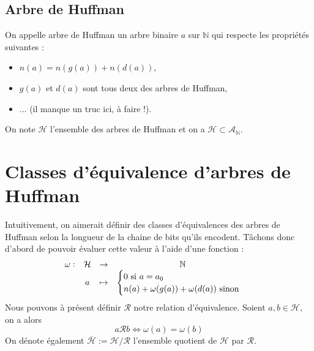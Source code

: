 \documentclass[a4paper, 12pt]{article}
\let\iff\Longleftrightarrow
\begin{document}
\subsection{Arbre de Huffman}
On appelle arbre de Huffman un arbre binaire $a$ sur $\mathbb{N}$ qui respecte les propriétés suivantes :
\begin{itemize}
\item $n(a) = n(g(a))+n(d(a))$,
\item $g(a)$ et $d(a)$ sont tous deux des arbres de Huffman,
\item ... (il manque un truc ici, à faire !).
\end{itemize}
On note $\mathcal{H}$ l'ensemble des arbres de Huffman et on a $\mathcal{H} \subset \mathcal{A}_\mathbb{N}$.

\section{Classes d'équivalence d'arbres de Huffman}
Intuitivement, on aimerait définir des classes d'équivalences des arbres de Huffman selon la longueur de la chaine de bits qu'ils encodent. Tâchons donc d'abord de pouvoir évaluer cette valeur à l'aide d'une fonction :
$$
\begin{matrix}
\omega: &\mathcal{H} &\rightarrow &\mathbb{N} \\
&a &\mapsto &{\begin{cases}
	0 \text{ si } a = a_0 \\    
	n(a)+\omega(g(a))+\omega(d(a)) \text{ sinon}
\end{cases}}
\end{matrix} \\
$$
Nous pouvons à présent définir $\mathcal{R}$ notre relation d'équivalence. Soient $a, b \in \mathcal{H}$, on a alors
$$
a \mathcal{R} b \iff \omega(a) = \omega(b)
$$
On dénote également $\overline{\mathcal{H}} := \mathcal{H}/\mathcal{R}$ l'ensemble quotient de $\mathcal{H}$ par $\mathcal{R}$.
\end{document}
